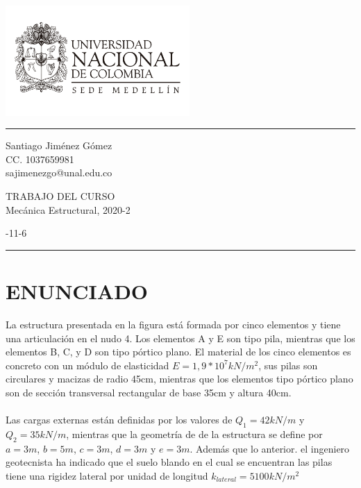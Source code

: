\documentclass[a4paper]{article}
\begin{document}

\fancyhead[C]{}
	\begin{minipage}{5cm}
		\includegraphics[width=7cm]{Logo_un.pdf} 
	\end{minipage}
\hrule \medskip %
\begin{minipage}{0.295\textwidth} 
\raggedright
\footnotesize
Santiago Jiménez Gómez  \hfill\\   
CC. 1037659981\hfill\\
sajimenezgo@unal.edu.co
\end{minipage}
\begin{minipage}{0.4\textwidth} 
\centering 
\large 
TRABAJO DEL CURSO  \\ 
\normalsize 
Mecánica Estructural, 2020-2\\ 
\end{minipage}
\begin{minipage}{0.295\textwidth} 
-11-6\\
\end{minipage}
\medskip\hrule 
\bigskip


\section*{ENUNCIADO}
La estructura presentada en la figura está formada por cinco elementos y tiene una articulación en el nudo 4. Los elementos A y E son tipo pila, mientras que los elementos B, C, y D son tipo pórtico plano. El material de los cinco elementos es concreto con un módulo de elasticidad $E = 1,9 *10^7 kN/m^2$, sus pilas son circulares y macizas de radio 45cm, mientras que los elementos tipo pórtico plano son de sección transversal rectangular de base 35cm y altura 40cm. 
\\
\\
Las cargas externas están definidas por los valores de $Q_1 = 42 kN/m$ y $Q_2 = 35 kN/m$, mientras que la geometría de de la estructura se define por $a = 3m$, $b = 5m$, $c = 3m$, $d = 3m$ y $e = 3m$. Además que lo anterior. el ingeniero geotecnista ha indicado que el suelo blando en el cual se encuentran las pilas tiene una rigidez lateral por unidad de longitud $k_{lateral} = 5100 kN/m^2$ 
\end{document}
